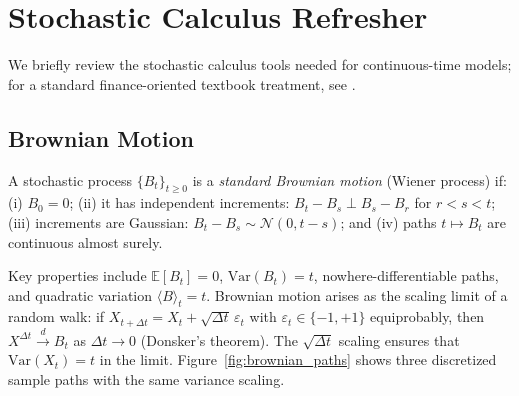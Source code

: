 \documentclass[11pt,a4paper]{report}
\newcommand{\E}[1]{\mathbb{E}\!\left[#1\right]}
\begin{document}
\section{Stochastic Calculus Refresher}
\label{sec:stoch_calc}

We briefly review the stochastic calculus tools needed for continuous-time models; for a standard finance-oriented textbook treatment, see \citet{shreve2004stochasticii}.

\subsection{Brownian Motion}

\begin{definitionbox}
A stochastic process $\{B_t\}_{t \geq 0}$ is a \emph{standard Brownian motion} (Wiener process) if: (i) $B_0 = 0$; (ii) it has independent increments: $B_t - B_s \perp B_s - B_r$ for $r < s < t$; (iii) increments are Gaussian: $B_t - B_s \sim \mathcal{N}(0, t-s)$; and (iv) paths $t \mapsto B_t$ are continuous almost surely.
\end{definitionbox}

Key properties include $\E{B_t} = 0$, $\mathrm{Var}(B_t) = t$, nowhere-differentiable paths, and quadratic variation $\langle B \rangle_t = t$.  Brownian motion arises as the scaling limit of a random walk: if $X_{t+\Delta t} = X_t + \sqrt{\Delta t}\,\varepsilon_t$ with $\varepsilon_t \in \{-1,+1\}$ equiprobably, then $X^{\Delta t} \xrightarrow{d} B_t$ as $\Delta t \to 0$ (Donsker's theorem).  The $\sqrt{\Delta t}$ scaling ensures that $\mathrm{Var}(X_t) = t$ in the limit.  Figure~\ref{fig:brownian_paths} shows three discretized sample paths with the same variance scaling.
\end{document}
